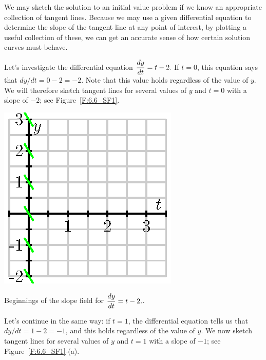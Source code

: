 We may sketch the solution to an initial value problem if we know an appropriate collection of tangent lines.  Because we may use a given differential equation to determine the slope of the tangent line at any point of interest, by plotting a useful collection of these, we can get an accurate sense of how certain solution curves must behave.

Let's investigate the differential equation $\displaystyle \frac{dy}{dt} = t-2.$ If $t=0$, this equation says that $dy/dt = 0-2=-2$.  Note that this value holds regardless of the value of $y$.  We will therefore sketch tangent lines for several values of $y$ and $t=0$ with a slope of $-2$; see Figure~\ref{F:6.6_SF1}.  

\begin{marginfigure}[-4cm] %
\begin{center}
\includegraphics{figures/7_2_field_0.eps}
\end{center}
\caption{Beginnings of the slope field for $\displaystyle \frac{dy}{dt} = t-2.$. }
\label{F:6.6_SF1}
\end{marginfigure}

Let's continue in the same way:  if $t=1$, the differential equation tells us that $dy/dt = 1-2=-1$, and this holds regardless of the value of $y$.  We now sketch tangent lines for several values of $y$ and $t=1$ with a slope of $-1$; see Figure~\ref{F:6.6_SF1}-(a).

%
%

